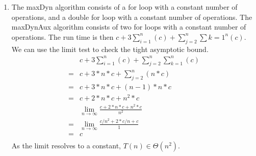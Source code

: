 \documentclass{assignment}
\begin{document}
\begin{problemlist}
\begin{answer}
\begin{enumerate}
\DecMargin{3em}
\clearpage
\item
The maxDyn algorithm consists of a for loop with a constant number of operations, and a double for loop with a constant number of operations. The maxDynAux algorithm consists of two for loops with a constant number of operations. The run time is then $c + 3\sum_{i=1}^n(c) + \sum_{j=2}^n\sum{k=1}^n(c)$.\\
We can use the limit test to check the tight asymptotic bound.
\begin{align*}
&c + 3\sum_{i=1}^n(c) + \sum_{j=2}^n\sum_{k=1}^n(c)\\
=&c + 3*n*c + \sum_{j=2}^n(n*c)\\
=&c + 3*n*c + (n-1)*n*c\\
=&c + 2*n*c + n^2*c\\
&\lim_{n\rightarrow \infty} \frac{c + 2*n*c + n^2*c}{n^2}\\
=&\lim_{n\rightarrow \infty} \frac{c/n^2 + 2*c/n + c}{1}\\
=&c\\
\end{align*} 
As the limit resolves to a constant, $T(n) \in \Theta(n^2)$.
\end{enumerate}
\end{answer}

\end{problemlist}
\end{document}

